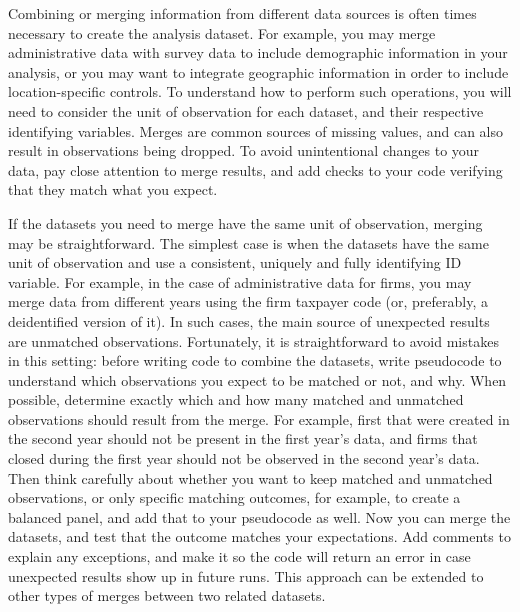 Combining or merging information from different data sources is often times necessary
to create the analysis dataset.
For example, you may merge administrative data with survey data
to include demographic information in your analysis,
or you may want to integrate geographic information
in order to include location-specific controls.
To understand how to perform such operations, 
you will need to consider the unit of observation for each dataset,
and their respective identifying variables.
Merges are common sources of missing values,
and can also result in observations being dropped.
To avoid unintentional changes to your data,
pay close attention to merge results,
and add checks to your code verifying that they match what you expect.

If the datasets you need to merge have the same unit of observation,
merging may be straightforward.
The simplest case is when the datasets have the same unit of observation
and use a consistent, uniquely and fully identifying ID variable. 
For example, in the case of administrative data for firms,
you may merge data from different years using the firm taxpayer code
(or, preferably, a deidentified version of it).
In such cases, the main source of unexpected results are unmatched observations.
Fortunately, it is straightforward to avoid mistakes in this setting:
before writing code to combine the datasets,
write pseudocode to understand which observations you expect to be
matched or not, and why.
When possible, determine exactly which and how many 
matched and unmatched observations should result from the merge.
For example, first that were created in the second year should not be
present in the first year's data, 
and firms that closed during the first year should not be observed in the second year's data. 
Then think carefully about whether you want to keep matched and unmatched
observations, or only specific matching outcomes,
 for example, to create a balanced panel,
and add that to your pseudocode as well.
Now you can merge the datasets, 
and test that the outcome matches your expectations.
Add comments to explain any exceptions, 
and make it so the code will return an error in case unexpected results show up in future runs.
This approach can be extended to other types of merges between two related datasets.


